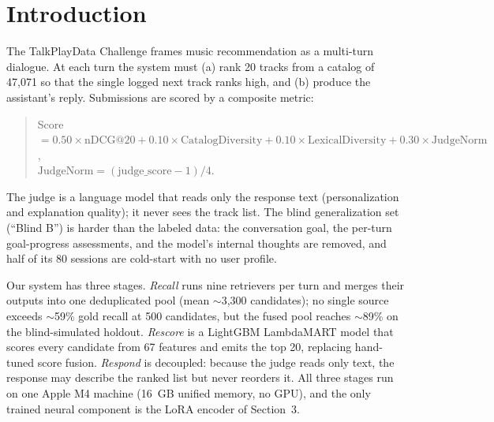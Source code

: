 \documentclass[sigconf]{acmart}
\begin{document}


\maketitle

\section{Introduction}

The TalkPlayData Challenge frames music recommendation as a multi-turn dialogue.
At each turn the system must (a) rank 20 tracks from a catalog of 47,071 so that
the single logged next track ranks high, and (b) produce the assistant's reply.
Submissions are scored by a composite metric:

\begin{quote}
Score $= 0.50 \times \text{nDCG@20} + 0.10 \times \text{CatalogDiversity} + 0.10 \times \text{LexicalDiversity} + 0.30 \times \text{JudgeNorm}$,\\
$\text{JudgeNorm} = (\text{judge\_score} - 1) / 4$.
\end{quote}

The judge is a language model that reads only the response text (personalization
and explanation quality); it never sees the track list. The blind generalization
set (``Blind B'') is harder than the labeled data: the conversation goal, the
per-turn goal-progress assessments, and the model's internal thoughts are removed,
and half of its 80 sessions are cold-start with no user profile.

Our system has three stages. \emph{Recall} runs nine retrievers per turn and merges
their outputs into one deduplicated pool (mean $\sim$3,300 candidates); no single
source exceeds $\sim$59\% gold recall at 500 candidates, but the fused pool reaches
$\sim$89\% on the blind-simulated holdout. \emph{Rescore} is a LightGBM LambdaMART model that
scores every candidate from 67 features and emits the top 20, replacing hand-tuned
score fusion. \emph{Respond} is decoupled: because the judge reads only text, the
response may describe the ranked list but never reorders it. All three stages run
on one Apple M4 machine (16~GB unified memory, no GPU), and the only trained
neural component is the LoRA encoder of Section~3.
\end{document}
